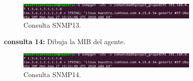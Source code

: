 \begin{figure}[htbp!]
	\centering
		\includegraphics[width=0.8\textwidth]{images/capturas/pregunta12}
	\caption{Consulta SNMP13.}
\end{figure}

\textbf{consulta 14:} Dibuja la MIB del agente.

\begin{figure}[htbp!]
	\centering
		\includegraphics[width=0.8\textwidth]{images/capturas/pregunta12}
	\caption{Consulta SNMP14.}
\end{figure}





